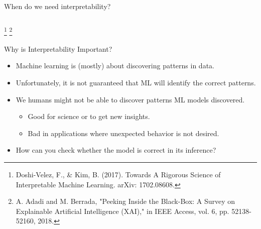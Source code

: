 \documentclass[11pt,compress,t,notes=noshow, aspectratio=169, xcolor=table]{beamer}
\begin{document}
\begin{frame}{When do we need interpretability?}
\begin{columns}[T]
\begin{column}{0.4\textwidth}
\end{column}
\end{columns}
     \lz
    \footnote[frame]{Doshi-Velez, F., \& Kim, B. (2017). Towards A Rigorous Science of Interpretable Machine Learning. arXiv: 1702.08608.}
    \footnote[frame]{A. Adadi and M. Berrada, "Peeking Inside the Black-Box: A Survey on Explainable Artificial Intelligence (XAI)," in IEEE Access, vol. 6, pp. 52138-52160, 2018.}
\end{frame}



\begin{frame}{Why is Interpretability Important?}

	\begin{itemize}
	    \item Machine learning is (mostly) about discovering patterns in data.
	    \medskip
	    \item Unfortunately, it is not guaranteed that ML will identify the correct patterns.

	    \medskip
	    \item We humans might not be able to discover patterns ML models discovered.
	    \begin{itemize}
	        \item Good for science or to get new insights.
	        \item Bad in applications where unexpected behavior is not desired.
	    \end{itemize}
	    \medskip

	    \item \alert{How can you check whether the model is correct in its inference?}
	\end{itemize}

\end{frame}
\end{document}
